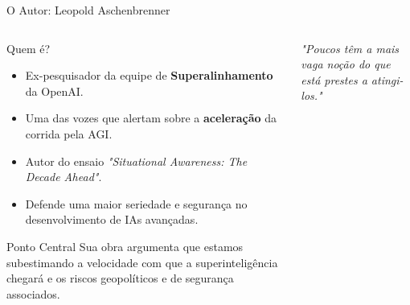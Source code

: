 \documentclass[aspectratio=169,12pt]{beamer}
\begin{document}
\begin{frame}{O Autor: Leopold Aschenbrenner}
    \begin{columns}
        \begin{column}{0.6\textwidth}
            \begin{block}{Quem é?}
                \begin{itemize}
                    \item Ex-pesquisador da equipe de \textbf{Superalinhamento} da OpenAI.
                    \item Uma das vozes que alertam sobre a \textbf{aceleração} da corrida pela AGI.
                    \item Autor do ensaio \textit{"Situational Awareness: The Decade Ahead"}.
                    \item Defende uma maior seriedade e segurança no desenvolvimento de IAs avançadas.
                \end{itemize}
            \end{block}
             \begin{exampleblock}{Ponto Central}
               Sua obra argumenta que estamos subestimando a velocidade com que a superinteligência chegará e os riscos geopolíticos e de segurança associados.
            \end{exampleblock}
        \end{column}
        \begin{column}{0.4\textwidth}
            \begin{center}
                {\Huge \faUserSecret}

                \vspace{1cm}
                
                \textit{"Poucos têm a mais vaga noção do que está prestes a atingi-los."}
            \end{center}
        \end{column}
    \end{columns}
\end{frame}
\end{document}
